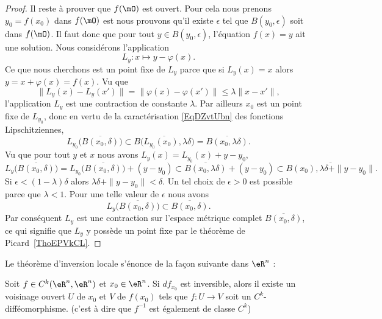 \begin{proof}
    Il reste à prouver que \( f(\mO)\) est ouvert. Pour cela nous prenons \( y_0=f(x_0)\) dans \( f(\mO)\) est nous prouvons qu'il existe \( \epsilon\) tel que \( B(y_0,\epsilon)\) soit dans \( f(\mO)\). Il faut donc que pour tout \( y\in B(y_0,\epsilon)\), l'équation \( f(x)=y\) ait une solution. Nous considérons l'application
    \begin{equation}
        L_y\colon x\mapsto y-\varphi(x).
    \end{equation}
    Ce que nous cherchons est un point fixe de \( L_y\) parce que si \( L_y(x)=x\) alors \( y=x+\varphi(x)=f(x)\). Vu que
    \begin{equation}
        \big\| L_y(x)-L_y(x') \big\|=\big\| \varphi(x)-\varphi(x') \big\|\leq\lambda\| x-x' \|,
    \end{equation}
    l'application \( L_y\) est une contraction de constante \( \lambda\). Par ailleurs \( x_0\) est un point fixe de \( L_{y_0}\), donc en vertu de la caractérisation \eqref{EqDZvtUbn} des fonctions Lipschitziennes,
    \begin{equation}
        L_{y_0}\big( \overline{ B(x_0,\delta) } \big)\subset \overline{ B\big( L_{y_0}(x_0),\lambda\delta \big) }=\overline{ B(x_0,\lambda\delta) }.
    \end{equation}
    Vu que pour tout \( y\) et \( x\) nous avons \( L_y(x)=L_{y_0}(x)+y-y_0\),
    \begin{equation}
    L_y\big( \overline{ B(x_0,\delta) } \big)=L_{y_0}\big( \overline{ B(x_0,\delta) } \big)+(y-y_0)\subset \overline{ B(x_0,\lambda\delta) }+(y-y_0)\subset \overline{ B(x_0),\lambda\delta+\| y-y_0 \| }.
    \end{equation}
    Si \( \epsilon<(1-\lambda)\delta\) alors \( \lambda\delta+\| y-y_0 \|<\delta\). Un tel choix de \( \epsilon>0\) est possible parce que \( \lambda<1\). Pour une telle valeur de \( \epsilon\) nous avons
    \begin{equation}
        L_y\big( \overline{ B(x_0,\delta) } \big)\subset \overline{ B(x_0,\delta) }.
    \end{equation}
    Par conséquent \( L_y\) est une contraction sur l'espace métrique complet \( \overline{ B(x_0,\delta) }\), ce qui signifie que \( L_y\) y possède un point fixe par le théorème de Picard~\ref{ThoEPVkCL}.
\end{proof}

Le théorème d'inversion locale s'énonce de la façon suivante dans \( \eR^n\) :
\begin{theorem}    \label{THOooQGGWooPBRNEX}      %
    Soit \( f\in C^k(\eR^n,\eR^n)\) et \( x_0\in \eR^n\). Si \( df_{x_0}\) est inversible, alors il existe un voisinage ouvert \( U\) de \( x_0\) et \( V\) de \( f(x_0)\) tels que \( f\colon U\to V\) soit un \( C^k\)-difféomorphisme. (c'est à dire que \( f^{-1}\) est également de classe \( C^k\))
\end{theorem}

